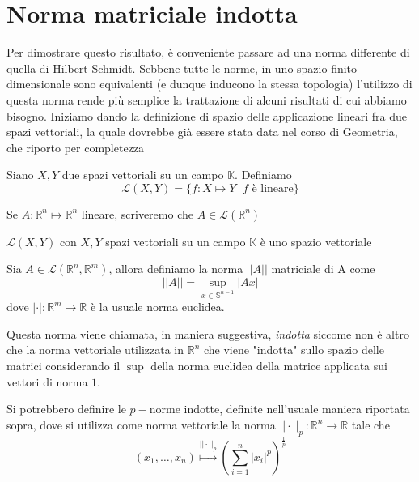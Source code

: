 \section{Norma matriciale indotta}
%
Per dimostrare questo risultato, è conveniente passare ad una norma differente di quella di Hilbert-Schmidt. Sebbene tutte le norme, in uno spazio finito dimensionale sono equivalenti (e dunque inducono la stessa topologia) l'utilizzo di questa norma rende più semplice la trattazione
di alcuni risultati di cui abbiamo bisogno. Iniziamo dando la definizione di spazio delle applicazione lineari fra due spazi vettoriali, la quale dovrebbe già essere stata data nel corso di Geometria, che riporto per completezza
%
\vspace{0.5cm}
\begin{definition}[\textcolor{blue}{spazio delle applicazioni lineari}]
    Siano $X, Y$ due spazi vettoriali su un campo $\mathbb{K}$. Definiamo
    \[
    \mathcal{L}(X, Y) = \{f: X \mapsto Y \, | \, f \text{ è lineare} \}
    \]
\end{definition}
%
\begin{remark}
    Se $A : \mathbb{R}^n \mapsto \mathbb{R}^n$ lineare, scriveremo che $A \in \mathcal{L}(\mathbb{R}^n)$
\end{remark}
%
\begin{remark}
    $\mathcal{L}(X, Y)$ con $X, Y$ spazi vettoriali su un campo $\mathbb{K}$ è uno spazio vettoriale
\end{remark}
%
\vspace{0.5cm}
\begin{definition}[\textcolor{blue}{norma matriciale indotta}]
    Sia $A \in \mathcal{L}(\mathbb{R}^n, \mathbb{R}^m)$, allora definiamo la norma $|| A ||$ matriciale di A come
    \begin{equation}
        || A || = \sup_{x \in \mathbb{S}^{n-1}} |Ax|
    \end{equation}
    dove $|\cdot|:\mathbb{R}^m \to \mathbb{R}$ è la usuale norma euclidea.
\end{definition}
%
\begin{remark}
    Questa norma viene chiamata, in maniera suggestiva, \emph{indotta} siccome non è altro che la norma vettoriale utilizzata in $\mathbb{R}^n$ che viene "indotta" sullo spazio delle matrici considerando il $\sup$ della norma euclidea della matrice applicata sui vettori di norma $1$.
\end{remark}
%
\begin{remark}
    Si potrebbero definire le $p-$norme indotte, definite nell'usuale maniera riportata sopra, dove si utilizza come norma vettoriale la norma $|| \cdot ||_p \, : \mathbb{R}^n \to \mathbb{R}$ tale che
    \[
    (x_1, \ldots, x_n) \stackrel{||\cdot||_p}{\mapsto} \left( \sum_{i=1}^n |x_i|^p \right)^{\frac{1}{p}}
    \]
\end{remark}
